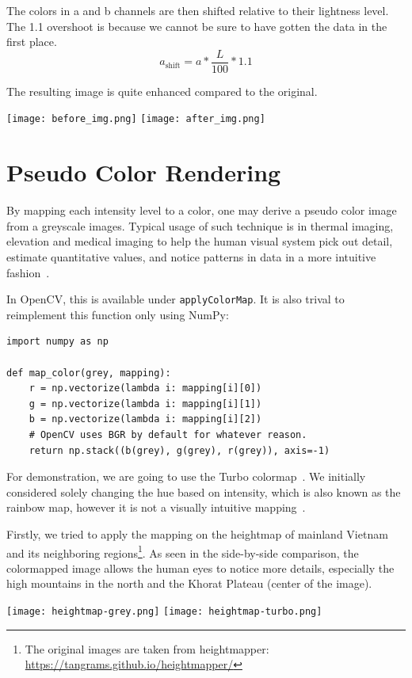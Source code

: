 \documentclass[a4paper,12pt]{article}
\begin{document}
The colors in a and b channels are then shifted relative to their lightness
level. The 1.1 overshoot is because we cannot be sure to have gotten the data
in the first place.
\[a_\mathrm{shift} = a * \frac{L}{100} * 1.1\]

The resulting image is quite enhanced compared to the original.
\begin{center}
  \texttt{[image: before\_img.png]}
  \texttt{[image: after\_img.png]}
\end{center}

\section{Pseudo Color Rendering}
By mapping each intensity level to a color, one may derive a pseudo color image
from a greyscale images.  Typical usage of such technique is in thermal imaging,
elevation and medical imaging to help the human visual system pick out detail,
estimate quantitative values, and notice patterns in data in a more intuitive
fashion~\cite{turbo}.

In OpenCV, this is available under \verb|applyColorMap|.  It is also trival
to reimplement this function only using NumPy:
\begin{verbatim}
import numpy as np

def map_color(grey, mapping):
    r = np.vectorize(lambda i: mapping[i][0])
    g = np.vectorize(lambda i: mapping[i][1])
    b = np.vectorize(lambda i: mapping[i][2])
    # OpenCV uses BGR by default for whatever reason.
    return np.stack((b(grey), g(grey), r(grey)), axis=-1)
\end{verbatim}

For demonstration, we are going to use the Turbo colormap~\cite{turbo}.
We initially considered solely changing the hue based on intensity,
which is also known as the rainbow map, however it is not a visually
intuitive mapping~\cite{rainbowbad}.

Firstly, we tried to apply the mapping on the heightmap of mainland Vietnam and
its neighboring regions\footnote{The original images are taken from
heightmapper: \url{https://tangrams.github.io/heightmapper/}}.  As seen in
the side-by-side comparison, the colormapped image allows the human eyes
to notice more details, especially the high mountains in the north and
the Khorat Plateau (center of the image).
\begin{center}
  \texttt{[image: heightmap-grey.png]}
  \texttt{[image: heightmap-turbo.png]}
\end{center}
\end{document}
